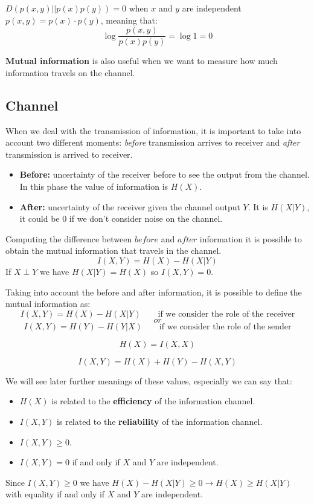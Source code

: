 $D(p(x,y)||p(x)p(y)) = 0$ when $x$ and $y$ are independent $p(x,y) = p(x)\cdot p(y)$, meaning that: 
$$\log \frac{p(x,y)}{p(x)p(y)} = \log 1 = 0 $$

\textbf{Mutual information} is also useful when we want to measure how much information travels on the channel.
\subsection{Channel}
When we deal with the transmission of information, it is important to take into account two different moments: \textit{before} transmission arrives to receiver and \textit{after} transmission is arrived to receiver. 
\begin{itemize}
	\item \textbf{Before:} uncertainty of the receiver before to see the output from the channel. In this phase the value of information is $H(X)$.
	\item \textbf{After:} uncertainty of the receiver given the channel output $Y$. It is $H(X|Y)$, it could be 0 if we don't consider noise on the channel.
\end{itemize}
Computing the difference between $before$ and $after$ information it is possible to obtain the mutual information that travels in the channel.
$$I(X,Y) = H(X) - H(X|Y)$$
If $X \perp Y$ we have $H(X|Y) = H(X)$ so $I(X,Y) = 0$. 
\begin{thm} Taking into account the before and after information, it is possible to define the mutual information as:
	$$I(X,Y) = H(X) - H(X|Y) \qquad \text{if we consider the role of the receiver}$$
	$$or$$
	$$I(X,Y) = H(Y) - H(Y|X) \qquad \text{if we consider the role of the sender}$$
\end{thm}
\begin{thm}
	$$H(X) = I(X,X)$$
\end{thm}
\begin{thm}
	$$I(X,Y) = H(X) + H(Y) - H(X,Y)$$
\end{thm}
We will see later further meanings of these values, especially we can say that:
\begin{itemize}
	\item $H(X)$ is related to the \textbf{efficiency} of the information channel.
	\item $I(X,Y)$ is related to the \textbf{reliability} of the information channel.
	\item $I(X,Y) \geq 0$.
	\item $I(X,Y) = 0$ if and only if $X$ and $Y$ are independent.
\end{itemize}
Since $I(X,Y) \geq 0$ we have $H(X) - H(X|Y) \geq 0 \rightarrow H(X) \geq H(X|Y)$  with equality if and only if $X$ and $Y$ are independent.

